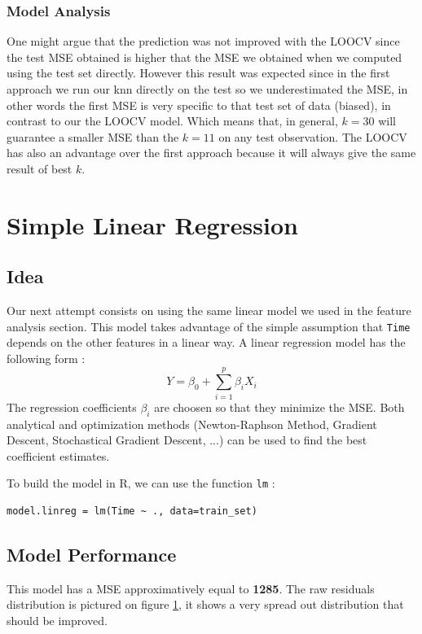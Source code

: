 \documentclass[]{report}
\newcommand{\inputtikz}[2]{%
	\scalebox{#1}{}  
}
\begin{document}
\subsubsection{Model Analysis}
One might argue that the prediction was not improved with the LOOCV since the test MSE obtained is higher that the MSE we obtained when we computed using the test set directly. However this result was expected since in the first approach we run our knn directly on the test so we underestimated the MSE, in other words the first MSE is very specific to that test set of data (biased), in contrast to our the LOOCV model. Which means that, in general, $k=30$ will guarantee a smaller MSE than the $k=11$ on any test observation.
The LOOCV has also an advantage over the first approach because it will always give the same result of best $k$.

\section{Simple Linear Regression}
\subsection{Idea}
Our next attempt consists on using the same linear model we used in the feature analysis section. This model takes advantage of the simple assumption that \texttt{Time} depends on the other features in a linear way. A linear regression model has the following form :
$$
Y = \beta_0 + \sum_{i = 1}^{p} \beta_i X_i
$$
The regression coefficients $\beta_i$ are choosen so that they minimize the MSE. Both analytical and optimization methods (Newton-Raphson Method, Gradient Descent, Stochastical Gradient Descent, ...) can be used to find the best coefficient estimates.

To build the model in R, we can use the function \texttt{lm} :
\begin{lstlisting}
model.linreg = lm(Time ~ ., data=train_set)
\end{lstlisting}

\subsection{Model Performance}
This model has a MSE approximatively equal to \textbf{1285}. The raw residuals distribution is pictured on figure \ref{fig:linreg_hist}, it shows a very spread out distribution that should be improved.

\begin{figure}[!h]
	\centering
	\inputtikz{0.5}{Figures/linreg_hist.tex}
	\caption{}
	\label{fig:linreg_hist}
\end{figure}
\end{document}
